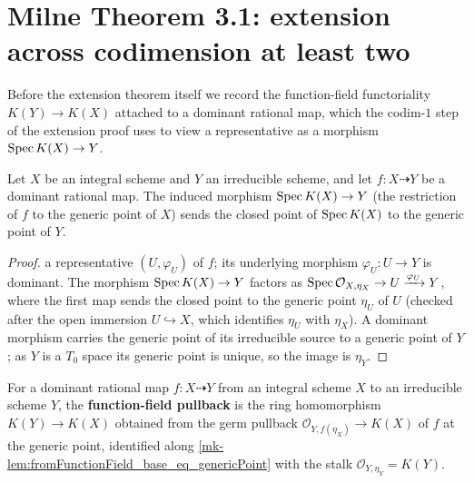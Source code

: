 \section{Milne Theorem 3.1: extension across codimension at least two}
\label{mk-sec:milne_thm31}

Before the extension theorem itself we record the function-field functoriality
\(K(Y) \to K(X)\) attached to a dominant rational map, which the codim-\(1\) step of
the extension proof uses to view a representative as a morphism \(\operatorname{Spec} K(X) \to Y\).

\begin{lemma}\label{mk-lem:fromFunctionField_base_eq_genericPoint}
  \leanok

  Let \(X\) be an integral scheme and \(Y\) an irreducible scheme, and let
  \(f \colon X \dashrightarrow Y\) be a dominant rational map. The induced morphism
  \(\operatorname{Spec} K(X) \to Y\) (the restriction of \(f\) to the generic point of \(X\))
  sends the closed point of \(\operatorname{Spec} K(X)\) to the generic point of \(Y\).
\end{lemma}

\begin{proof}
  \leanokChoose a representative \((U, \varphi_U)\) of \(f\); its underlying morphism
  \(\varphi_U \colon U \to Y\) is dominant. The morphism \(\operatorname{Spec} K(X) \to Y\) factors as
  \(\operatorname{Spec} \mathcal O_{X,\eta_X} \to U \xrightarrow{\varphi_U} Y\), where the first map
  sends the closed point to the generic point \(\eta_U\) of \(U\) (checked after the open
  immersion \(U \hookrightarrow X\), which identifies \(\eta_U\) with \(\eta_X\)). A
  dominant morphism carries the generic point of its irreducible source to a generic
  point of \(Y\); as \(Y\) is a \(T_0\) space its generic point is unique, so the image
  is \(\eta_Y\).
\end{proof}

\begin{definition}\label{mk-def:functionFieldPullback}
  \leanok

  For a dominant rational map \(f \colon X \dashrightarrow Y\) from an integral scheme
  \(X\) to an irreducible scheme \(Y\), the \textbf{function-field pullback} is the ring
  homomorphism \(K(Y) \to K(X)\) obtained from the germ pullback
  \(\mathcal O_{Y, f(\eta_X)} \to K(X)\) of \(f\) at the generic point, identified along
  \ref{mk-lem:fromFunctionField_base_eq_genericPoint} with the stalk
  \(\mathcal O_{Y,\eta_Y} = K(Y)\).
\end{definition}


